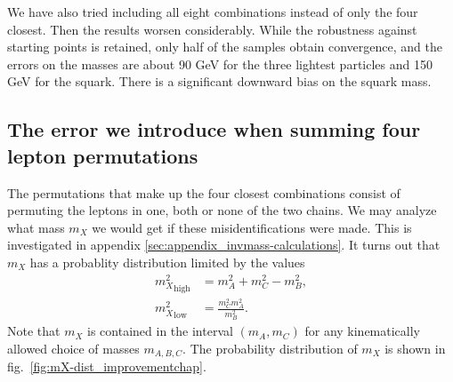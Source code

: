 \documentclass[twoside,english]{uiofysmaster}
\begin{document}
We have also tried including all eight combinations instead of only the four closest. Then the results worsen considerably. While the robustness against starting points is retained, only half of the samples obtain convergence, and the errors on the masses are about 90 GeV for the three lightest particles and 150 GeV for the squark. There is a significant downward bias on the squark mass.

\subsection{The error we introduce when summing four lepton permutations}
The permutations that make up the four closest combinations consist of permuting the leptons in one, both or none of the two chains. We may analyze what mass $m_X$ we would get if these misidentifications were made. This is investigated in appendix \ref{sec:appendix_invmass-calculations}. It turns out that $m_X$ has a probablity distribution limited by the values 
\begin{align}
	{m_X^2}_\mathrm{high} &= m_A^2 + m_C^2 - m_B^2,\\
	{m_X^2}_\mathrm{low} &= \frac{m_C^2 m_A^2}{m_B^2}.\nonumber
\end{align}
Note that $m_X$ is contained in the interval $(m_A, m_C)$ for any kinematically allowed choice of masses $m_{A,B,C}.$ The probability distribution of $m_X$ is shown in fig.\ \ref{fig:mX-dist_improvementchap}.
\end{document}
